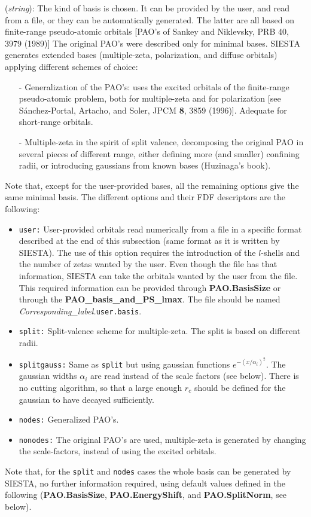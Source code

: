 \begin{description}
\itemsep 10pt
\parsep 0pt

\item[{\bf PAO.BasisType}] ({\it string}): 
The kind of basis is chosen. It can be provided by the user, and read from 
a file, or they can be automatically generated. The latter are all based
on finite-range pseudo-atomic orbitals [PAO's of Sankey and Niklevsky, 
PRB 40, 3979 (1989)]
The original PAO's were described only for minimal bases. SIESTA generates 
extended bases (multiple-zeta, polarization, and diffuse orbitals) applying
different schemes of choice:
\begin{itemize}
\item[-] Generalization of the PAO's: uses the excited orbitals of the
finite-range pseudo-atomic problem, both for multiple-zeta and for
polarization [see S\'anchez-Portal, Artacho, and Soler, JPCM {\bf 8}, 3859
(1996)]. Adequate for short-range orbitals.
\item[-] Multiple-zeta in the spirit of split valence, decomposing the original
PAO in several pieces of different range, either defining more (and smaller)
confining radii, or introducing gaussians from known bases (Huzinaga's book).
\end{itemize}
\noindent
Note that, except for the user-provided bases, all the remaining options
give the same minimal basis. 
The different options and their FDF descriptors are the following:
\begin{itemize}
\item {\tt user:} User-provided orbitals read numerically from a file in
a specific format described at the end of this subsection (same format 
as it is written by SIESTA). The use of this option requires the
introduction of the $l$-shells and the number of zetas wanted by the user.
Even though the file has that information, SIESTA can take the orbitals
wanted by the user from the file. This required information can be provided
through {\bf PAO.BasisSize} or through the {\bf PAO\_basis\_and\_PS\_lmax}.
The file should be named {\it Corresponding\_label.}{\tt user.basis}.
\item {\tt split:} Split-valence scheme for multiple-zeta.
The split is based on different radii. 
\item {\tt splitgauss:} Same as {\tt split} but using gaussian functions
$e^{-(x/\alpha_i)^2}$. The gaussian widths $\alpha_i$ are read instead 
of the scale factors (see below). There is no cutting algorithm, so that
a large enough $r_c$ should be defined for the gaussian to have decayed
sufficiently.
\item {\tt nodes:} Generalized PAO's.
\item {\tt nonodes:} The original PAO's are used, multiple-zeta is generated
by changing the scale-factors, instead of using the excited orbitals. 
\end{itemize}
\noindent
Note that, for the {\tt split} and {\tt nodes} cases
the whole basis can be generated by SIESTA, no further information
required, using default values defined in the following ({\bf PAO.BasisSize},
{\bf PAO.EnergyShift}, and {\bf PAO.SplitNorm}, see below).


\end{description}
